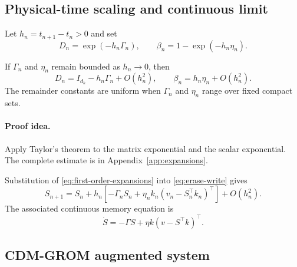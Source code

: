 \subsection{Physical-time scaling and continuous limit}
\label{sec:continuous-limit}

Let $h_n=t_{n+1}-t_n>0$ and set
\begin{equation}
 D_n=\exp(-h_n\Gamma_n),\qquad
 \beta_n=1-\exp(-h_n\eta_n).
 \label{eq:physical-scaling}
\end{equation}

\label{lem:expansions}
\begin{lemmaone}
If $\Gamma_n$ and $\eta_n$ remain bounded as $h_n\to0$, then
\begin{equation}
 D_n=I_{d_k}-h_n\Gamma_n+O(h_n^2),\qquad
 \beta_n=h_n\eta_n+O(h_n^2).
 \label{eq:first-order-expansions}
\end{equation}
The remainder constants are uniform when $\Gamma_n$ and $\eta_n$ range over
fixed compact sets.
\end{lemmaone}

\paragraph{Proof idea.}
Apply Taylor's theorem to the matrix exponential and the scalar exponential.
The complete estimate is in Appendix~\ref{app:expansions}.

Substitution of \eqref{eq:first-order-expansions} into
\eqref{eq:erase-write} gives
\begin{equation}
 S_{n+1}
 =S_n+h_n\left[
 -\Gamma_nS_n+\eta_nk_n(v_n-S_n^\top k_n)^\top
 \right]+O(h_n^2).
 \label{eq:discrete-first-order}
\end{equation}
The associated continuous memory equation is
\begin{equation}
 \boxed{
 \dot S=-\Gamma S+\eta k(v-S^\top k)^\top.}
 \label{eq:continuous-memory}
\end{equation}

\subsection{CDM-GROM augmented system}
\label{sec:augmented-system}

